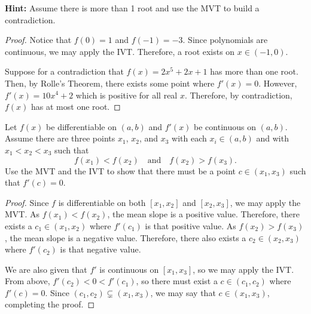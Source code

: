 \documentclass{agony}
\begin{document}
\textbf{Hint:} Assume there is more than 1 root and use the MVT to build a contradiction.
\begin{proof}
  Notice that $f(0) = 1$ and $f(-1) = -3$.
  Since polynomials are continuous, we may apply the IVT\@.
  Therefore, a root exists on $x\in(-1,0)$.

  Suppose for a contradiction that $f(x) = 2x^5 + 2x + 1$ has more than one root.
  Then, by Rolle's Theorem, there exists some point where $f'(x) = 0$.
  However, $f'(x) = 10x^4 + 2$ which is positive for all real $x$.
  Therefore, by contradiction, $f(x)$ has at most one root.
\end{proof}


\question Let $f(x)$ be differentiable on $(a, b)$ and $f'(x)$ be continuous on $(a, b)$.
Assume there are three points $x_1$, $x_2$, and $x_3$ with each $x_i\in(a,b)$
and with $x_1<x_2<x_3$ such that \[ f(x_1) < f(x_2) \quad \textrm{and} \quad f(x_2) > f(x_3). \]
Use the MVT and the IVT to show that there must be a point $c\in(x_1, x_3)$ such that $f'(c) = 0$.
\begin{proof}
  Since $f$ is differentiable on both $[x_1,x_2]$ and $[x_2, x_3]$, we may apply the MVT\@.
  As $f(x_1) < f(x_2)$, the mean slope is a positive value.
  Therefore, there exists a $c_1\in(x_1,x_2)$ where $f'(c_1)$ is that positive value.
  As $f(x_2) > f(x_3)$, the mean slope is a negative value.
  Therefore, there also exists a $c_2\in(x_2,x_3)$ where $f'(c_2)$ is that negative value.
  
  We are also given that $f'$ is continuous on $[x_1,x_3]$, so we may apply the IVT\@.
  From above, $f'(c_2) < 0 < f'(c_1)$, so there must exist a $c\in(c_1,c_2)$ where $f'(c)=0$.
  Since $(c_1,c_2) \subsetneq (x_1,x_3)$, we may say that $c\in(x_1,x_3)$, completing the proof.
\end{proof}
\end{document}
